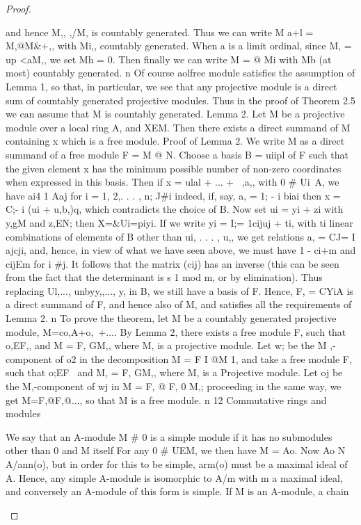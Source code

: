 \begin{proof}
\begin{mathematicalrecord}
{and hence M,, ,/M, is countably generated. Thus we can write
        M a+l = M,@M&+,,         with Mi,, countably generated.
When a is a limit ordinal, since M, = up <aM,, we set Mh = 0. Then finally
we can write
        M = @ Mi with Mb (at most) countably generated. n
   Of course aolfree module satisfies the assumption of Lemma 1, so that,
in particular, we see that any projective module is a direct sum of countably
generated projective modules. Thus in the proof of Theorem 2.5 we can
assume that M is countably generated.
Lemma 2. Let M be a projective module over a local ring A, and XEM.
Then there exists a direct summand of M containing x which is a free
module.
Proof of Lemma 2. We write M as a direct summand of a free module
F = M @ N. Choose a basis B = {ui}ipl of F such that the given element
x has the minimum         possible number of non-zero coordinates when
expressed in this basis. Then if x = ulal + ... + ~,a,, with 0 # Ui~A, we have
          ai4 1 Aaj for i = 1, 2,. . . , n;
             J#i
indeed, if, say, a, = 1; - i biai then x = C;- i (ui + u,b,)q, which contradicts
the choice of B. Now set ui = yi + zi with y,gM and z,EN; then
          X=&Ui=piyi.
If we write yi = I;= 1cijuj + ti, with ti linear combinations of elements of
B other than ui, . . . , u,, we get relations a, = CJ= I ajcji, and, hence, in view
of what we have seen above, we must have
          1 - ci+m       and cijEm for i #j.
It follows that the matrix (cij) has an inverse (this can be seen from the
fact that the determinant is s 1 mod m, or by elimination). Thus replacing
Ul,..., unbyy,,...,     y, in B, we still have a basis of F. Hence, F, = CYiA is
a direct summand of F, and hence also of M, and satisfies all the
requirements of Lemma 2. n
   To prove the theorem, let M be a countably generated projective module,
M=co,A+o,~+....              By Lemma 2, there exists a free module F, such
that o,EF,, and M = F, GM,, where M, is a projective module. Let w;
be the M ,-component of o2 in the decomposition M = F I @M 1, and take
a free module F, such that o;EF~ and M, = F, GM,, where M, is a
Projective module. Let oj be the M,-component                 of wj in M = F, @
F, 0 M,; proceeding in the same way, we get
         M=F,@F,@...,
so that M is a free module.       n
12       Commutative    rings and modules

   We say that an A-module M # 0 is a simple module if it has no
submodules other than 0 and M itself For any 0 # UEM, we then have
M = Ao. Now Ao N A/ann(o), but in order for this to be simple, arm(o)
must be a maximal ideal of A. Hence, any simple A-module is isomorphic
to A/m with m a maximal ideal, and conversely an A-module of this form
is simple. If M is an A-module, a chain

}
\end{mathematicalrecord}
\end{proof}
